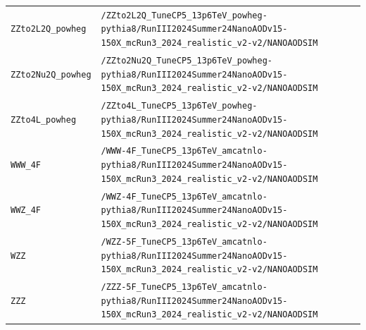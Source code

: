 \begin{longtable}{@{}>{\RaggedRight\arraybackslash}p{} >{\RaggedRight\arraybackslash}p{}@{}}
\addlinespace[2pt]
\texttt{ZZto2L2Q\_\allowbreak{}powheg} & \texttt{/\allowbreak{}ZZto2L2Q\_\allowbreak{}TuneCP5\_\allowbreak{}13p6TeV\_\allowbreak{}powheg-\allowbreak{}pythia8/\allowbreak{}RunIII2024Summer24NanoAODv15-\allowbreak{}150X\_\allowbreak{}mcRun3\_\allowbreak{}2024\_\allowbreak{}realistic\_\allowbreak{}v2-\allowbreak{}v2/\allowbreak{}NANOAODSIM} \\
\addlinespace[2pt]
\texttt{ZZto2Nu2Q\_\allowbreak{}powheg} & \texttt{/\allowbreak{}ZZto2Nu2Q\_\allowbreak{}TuneCP5\_\allowbreak{}13p6TeV\_\allowbreak{}powheg-\allowbreak{}pythia8/\allowbreak{}RunIII2024Summer24NanoAODv15-\allowbreak{}150X\_\allowbreak{}mcRun3\_\allowbreak{}2024\_\allowbreak{}realistic\_\allowbreak{}v2-\allowbreak{}v2/\allowbreak{}NANOAODSIM} \\
\addlinespace[2pt]
\texttt{ZZto4L\_\allowbreak{}powheg} & \texttt{/\allowbreak{}ZZto4L\_\allowbreak{}TuneCP5\_\allowbreak{}13p6TeV\_\allowbreak{}powheg-\allowbreak{}pythia8/\allowbreak{}RunIII2024Summer24NanoAODv15-\allowbreak{}150X\_\allowbreak{}mcRun3\_\allowbreak{}2024\_\allowbreak{}realistic\_\allowbreak{}v2-\allowbreak{}v2/\allowbreak{}NANOAODSIM} \\
\addlinespace[2pt]
\texttt{WWW\_\allowbreak{}4F} & \texttt{/\allowbreak{}WWW-\allowbreak{}4F\_\allowbreak{}TuneCP5\_\allowbreak{}13p6TeV\_\allowbreak{}amcatnlo-\allowbreak{}pythia8/\allowbreak{}RunIII2024Summer24NanoAODv15-\allowbreak{}150X\_\allowbreak{}mcRun3\_\allowbreak{}2024\_\allowbreak{}realistic\_\allowbreak{}v2-\allowbreak{}v2/\allowbreak{}NANOAODSIM} \\
\addlinespace[2pt]
\texttt{WWZ\_\allowbreak{}4F} & \texttt{/\allowbreak{}WWZ-\allowbreak{}4F\_\allowbreak{}TuneCP5\_\allowbreak{}13p6TeV\_\allowbreak{}amcatnlo-\allowbreak{}pythia8/\allowbreak{}RunIII2024Summer24NanoAODv15-\allowbreak{}150X\_\allowbreak{}mcRun3\_\allowbreak{}2024\_\allowbreak{}realistic\_\allowbreak{}v2-\allowbreak{}v2/\allowbreak{}NANOAODSIM} \\
\addlinespace[2pt]
\texttt{WZZ} & \texttt{/\allowbreak{}WZZ-\allowbreak{}5F\_\allowbreak{}TuneCP5\_\allowbreak{}13p6TeV\_\allowbreak{}amcatnlo-\allowbreak{}pythia8/\allowbreak{}RunIII2024Summer24NanoAODv15-\allowbreak{}150X\_\allowbreak{}mcRun3\_\allowbreak{}2024\_\allowbreak{}realistic\_\allowbreak{}v2-\allowbreak{}v2/\allowbreak{}NANOAODSIM} \\
\addlinespace[2pt]
\texttt{ZZZ} & \texttt{/\allowbreak{}ZZZ-\allowbreak{}5F\_\allowbreak{}TuneCP5\_\allowbreak{}13p6TeV\_\allowbreak{}amcatnlo-\allowbreak{}pythia8/\allowbreak{}RunIII2024Summer24NanoAODv15-\allowbreak{}150X\_\allowbreak{}mcRun3\_\allowbreak{}2024\_\allowbreak{}realistic\_\allowbreak{}v2-\allowbreak{}v2/\allowbreak{}NANOAODSIM} \\

\end{longtable}
